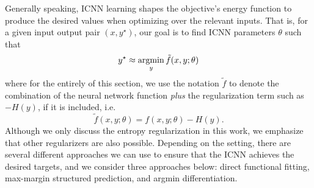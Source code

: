 




Generally speaking, ICNN learning shapes the objective's energy function to
produce the desired values when optimizing over the relevant inputs.  That is,
for a given input output pair $(x,y^\star)$, our goal is to find ICNN parameters
$\theta$ such that
\begin{equation}
y^\star \approx \operatorname*{argmin}_y \tilde{f}(x,y;\theta)
\end{equation}
where for the entirely of this section, we use the notation $\tilde{f}$ to
denote the combination of the neural network function \emph{plus} the
regularization term such as $-H(y)$, if it is included, i.e.
\begin{equation}
\tilde{f}(x,y;\theta) = f(x,y;\theta) - H(y).
\end{equation}
Although we only discuss the entropy regularization in this work, we emphasize
that other regularizers are also possible. Depending on the setting, there are
several different approaches we can use
to ensure that the ICNN achieves the desired targets, and we consider three
approaches below: direct functional fitting,
max-margin structured prediction, and argmin differentiation.


